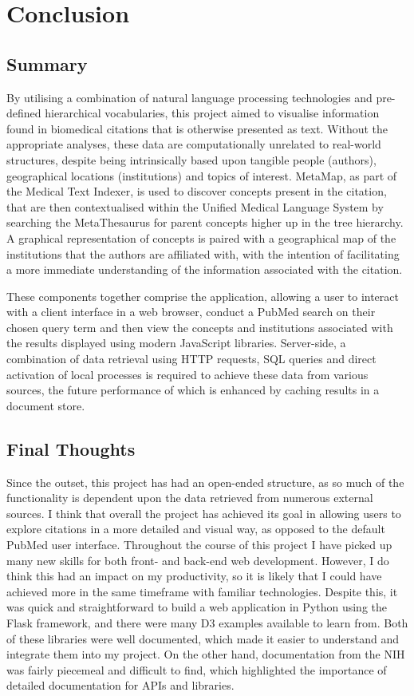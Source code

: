 \documentclass[Report.tex]{subfiles}
\begin{document}
\chapter{Conclusion}
\section{Summary}
By utilising a combination of natural language processing technologies and pre-defined hierarchical vocabularies, this project aimed to visualise information found in biomedical citations that is otherwise presented as text. Without the appropriate analyses, these data are computationally unrelated to real-world structures, despite being intrinsically based upon tangible people (authors), geographical locations (institutions) and topics of interest. MetaMap, as part of the Medical Text Indexer, is used to discover concepts present in the citation, that are then contextualised within the Unified Medical Language System by searching the MetaThesaurus for parent concepts higher up in the tree hierarchy. A graphical representation of concepts is paired with a geographical map of the institutions that the authors are affiliated with, with the intention of facilitating a more immediate understanding of the information associated with the citation.\newline

\noindent These components together comprise the application, allowing a user to interact with a client interface in a web browser, conduct a PubMed search on their chosen query term and then view the concepts and institutions associated with the results displayed using modern JavaScript libraries. Server-side, a combination of data retrieval using HTTP requests, SQL queries and direct activation of local processes is required to achieve these data from various sources, the future performance of which is enhanced by caching results in a document store.

\section{Final Thoughts}
Since the outset, this project has had an open-ended structure, as so much of the functionality is dependent upon the data retrieved from numerous external sources. I think that overall the project has achieved its goal in allowing users to explore citations in a more detailed and visual way, as opposed to the default PubMed user interface. Throughout the course of this project I have picked up many new skills for both front- and back-end web development. However, I do think this had an impact on my productivity, so it is likely that I could have achieved more in the same timeframe with familiar technologies. Despite this, it was quick and straightforward to build a web application in Python using the Flask framework, and there were many D3 examples available to learn from. Both of these libraries were well documented, which made it easier to understand and integrate them into my project. On the other hand, documentation from the NIH was fairly piecemeal and difficult to find, which highlighted the importance of detailed documentation for APIs and libraries.\newline
\end{document}
